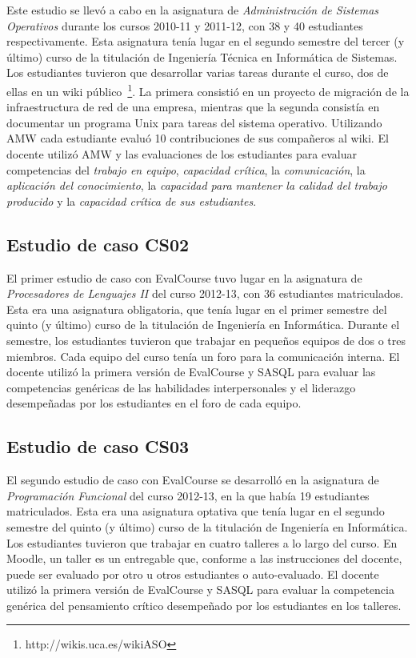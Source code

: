 		Este estudio se llevó a cabo en la asignatura de \emph{Administración de Sistemas Operativos} durante los cursos 2010-11 y 2011-12, con 38 y 40 estudiantes respectivamente. Esta asignatura tenía lugar en el segundo semestre del tercer (y último) curso de la titulación de Ingeniería Técnica en Informática de Sistemas. Los estudiantes tuvieron que desarrollar varias tareas durante el curso, dos de ellas en un wiki público~\footnote{http://wikis.uca.es/wikiASO}. La primera consistió en un proyecto de migración de la infraestructura de red de una empresa, mientras que la segunda consistía en documentar un programa Unix para tareas del sistema operativo. Utilizando AMW cada estudiante evaluó 10 contribuciones de sus compañeros al wiki. El docente utilizó AMW y las evaluaciones de los estudiantes para evaluar competencias del \emph{trabajo en equipo}, \emph{capacidad crítica}, la \emph{comunicación}, la \emph{aplicación del conocimiento}, la \emph{capacidad para mantener la calidad del trabajo producido} y la \emph{capacidad crítica de sus estudiantes}.

	\subsection{Estudio de caso CS02}

		El primer estudio de caso con EvalCourse tuvo lugar en la asignatura de \emph{Procesadores de Lenguajes II} del curso 2012-13, con 36 estudiantes matriculados. Esta era una asignatura obligatoria, que tenía lugar en el primer semestre del quinto (y último) curso de la titulación de Ingeniería en Informática. Durante el semestre, los estudiantes tuvieron que trabajar en pequeños equipos de dos o tres miembros. Cada equipo del curso tenía un foro para la comunicación interna. El docente utilizó la primera versión de EvalCourse y SASQL para evaluar las competencias genéricas de las habilidades interpersonales y el liderazgo desempeñadas por los estudiantes en el foro de cada equipo. 

	\subsection{Estudio de caso CS03}

		El segundo estudio de caso con EvalCourse se desarrolló en la asignatura de \emph{Programación Funcional} del curso 2012-13, en la que había 19 estudiantes matriculados. Esta era una asignatura optativa que tenía lugar en el segundo semestre del quinto (y último) curso de la titulación de Ingeniería en Informática. Los estudiantes tuvieron que trabajar en cuatro talleres a lo largo del curso. En Moodle, un taller es un entregable que, conforme a las instrucciones del docente, puede ser evaluado por otro u otros estudiantes o auto-evaluado. El docente utilizó la primera versión de EvalCourse y SASQL para evaluar la competencia genérica del pensamiento crítico desempeñado por los estudiantes en los talleres.

